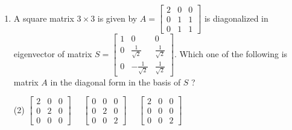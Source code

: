 \begin{enumerate}
	 \begin{tasks}(2)
		\task[\textbf{a.}] $\left[\begin{array}{c}-2 \\ 1 \\ 1\end{array}\right]$
		\task[\textbf{b.}]$\left[\begin{array}{c}0 \\ 2 \\ -2\end{array}\right]$
		\task[\textbf{c.}]$\left[\begin{array}{l}1 \\ 0 \\ 1\end{array}\right]$
		\task[\textbf{d.}]  $\left[\begin{array}{c}1 \\ -1 \\ 0\end{array}\right]$
	\end{tasks}
	\item A square matrix $3 \times 3$ is given by $A=\left[\begin{array}{lll}2 & 0 & 0 \\ 0 & 1 & 1 \\ 0 & 1 & 1\end{array}\right]$ is diagonalized in eigenvector of
	matrix $S=\left[\begin{array}{ccc}1 & 0 & 0 \\ 0 & \frac{1}{\sqrt{2}} & \frac{1}{\sqrt{2}} \\ 0 & -\frac{1}{\sqrt{2}} & \frac{1}{\sqrt{2}}\end{array}\right] .$ Which one of the following is matrix $A$ in the diagonal form in the
	basis of $S$ ?
	 \begin{tasks}(2)
		\task[\textbf{a.}] $\left[\begin{array}{lll}2 & 0 & 0 \\ 0 & 2 & 0 \\ 0 & 0 & 0\end{array}\right] \quad$ 
		\task[\textbf{b.}] $\left[\begin{array}{lll}0 & 0 & 0 \\ 0 & 2 & 0 \\ 0 & 0 & 2\end{array}\right] \quad$ 
		\task[\textbf{c.}]$\left[\begin{array}{lll}2 & 0 & 0 \\ 0 & 0 & 0 \\ 0 & 0 & 2\end{array}\right] \quad$

\end{tasks}
\end{enumerate}
